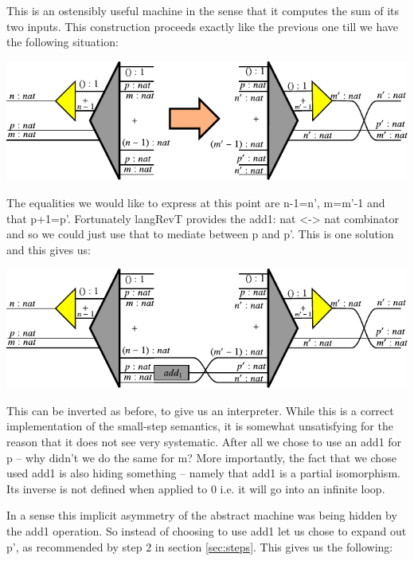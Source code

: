 \documentclass{llncs}
\begin{document}
This is an ostensibly useful machine in the sense that it computes the
sum of its two inputs.  This construction proceeds exactly like the
previous one till we have the following situation:

\begin{center}
  \includegraphics{diagrams/adder1.pdf}
\end{center}

The equalities we would like to express at this point are {{n-1=n'}},
{{m=m'-1}} and that {{p+1=p'}}. Fortunately {{langRevT}} provides the
{{add1: nat <-> nat}} combinator and so we could just use that to
mediate between {{p}} and {{p'}}. This is one solution and this gives
us:

\begin{center}
  \includegraphics{diagrams/adder2.pdf}
\end{center}

This can be inverted as before, to give us an interpreter. While this
is a correct implementation of the small-step semantics, it is
somewhat unsatisfying for the reason that it does not see very
systematic. After all we chose to use an {{add1}} for {{p}} -- why
didn't we do the same for {{m}}? More importantly, the fact that we
chose used {{add1}} is also hiding something -- namely that {{add1}}
is a partial isomorphism. Its inverse is not defined when applied to
{{0}} i.e. it will go into an infinite loop. 

In a sense this implicit asymmetry of the abstract machine was being
hidden by the {{add1}} operation. So instead of choosing to use
{{add1}} let us chose to expand out {{p'}}, as recommended by step 2
in section \ref{sec:steps}. This gives us the following: 
\end{document}
